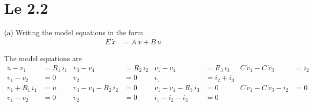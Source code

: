 \section{Le 2.2}
(a) Writing the model equations in the form 
\begin{align*}
    E\,\dot x &= A\,x + B\,u
\end{align*}

The model equations are
\begin{align*}
    u - v_1 &= R_1\,i_1 & 
    v_3 - v_4 &= R_2\,i_2 & 
    v_1 - v_4 &= R_3\,i_3 & 
    C\,\dot v_1 -C\,\dot v_3 &= i_2 \\
    v_1 - v_2 &= 0 & 
    v_2 &= 0 & 
    i_1 &= i_2 + i_3 \\
    v_1 + R_1\,i_1 &= u & 
    v_3 - v_4 - R_2\,i_2 &= 0 & 
    v_1 - v_4 - R_3\,i_3 &=  0& 
    C\,\dot v_1 -C\,\dot v_3 - i_2 &= 0\\
    v_1 - v_2 &= 0 & 
    v_2 &= 0 & 
    i_1 - i_2 - i_3 &= 0
\end{align*}

